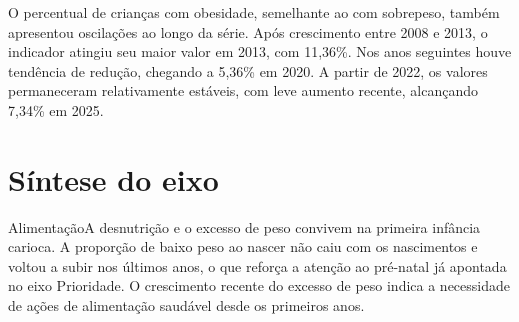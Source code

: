 
O percentual de crianças com obesidade, semelhante ao com sobrepeso, também apresentou oscilações ao longo da série. Após crescimento entre 2008 e 2013, o indicador atingiu seu maior valor em 2013, com 11,36\%. Nos anos seguintes houve tendência de redução, chegando a 5,36\% em 2020. A partir de 2022, os valores permaneceram relativamente estáveis, com leve aumento recente, alcançando 7,34\% em 2025.


\section{Síntese do eixo}

\begin{sintese}{Alimentação}A desnutrição e o excesso de peso convivem na primeira infância carioca. A proporção de baixo peso ao nascer não caiu com os nascimentos e voltou a subir nos últimos anos, o que reforça a atenção ao pré-natal já apontada no eixo Prioridade. O crescimento recente do excesso de peso indica a necessidade de ações de alimentação saudável desde os primeiros anos.\end{sintese}

